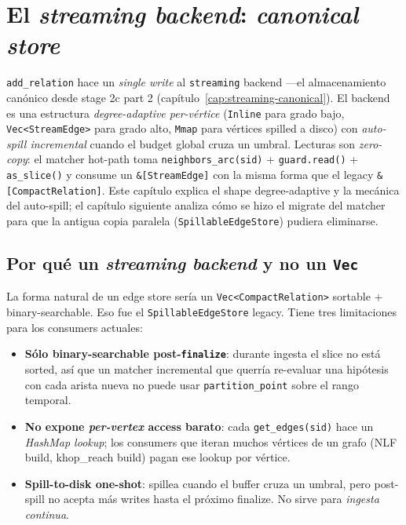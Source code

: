 \chapter{El \emph{streaming backend}: \emph{canonical store}}
\label{cap:streaming-mirror}

\begin{intuicion}
\texttt{add\_relation} hace un \emph{single write} al
\texttt{streaming} backend ---el almacenamiento canónico desde
stage 2c part 2 (capítulo~\ref{cap:streaming-canonical}). El
backend es una estructura \emph{degree-adaptive per-vértice}
(\texttt{Inline} para grado bajo, \texttt{Vec<StreamEdge>} para
grado alto, \texttt{Mmap} para vértices spilled a disco) con
\emph{auto-spill incremental} cuando el budget global cruza un
umbral. Lecturas son \emph{zero-copy}: el matcher hot-path toma
\texttt{neighbors\_arc(sid)} + \texttt{guard.read()} +
\texttt{as\_slice()} y consume un \texttt{\&[StreamEdge]} con la
misma forma que el legacy \texttt{\&[CompactRelation]}. Este
capítulo explica el shape degree-adaptive y la mecánica del
auto-spill; el capítulo siguiente analiza cómo se hizo el migrate
del matcher para que la antigua copia paralela
(\texttt{SpillableEdgeStore}) pudiera eliminarse.
\end{intuicion}

\section{Por qué un \emph{streaming backend} y no un \texttt{Vec}}

La forma natural de un edge store sería un \texttt{Vec<CompactRelation>}
sortable + binary-searchable. Eso fue el \texttt{SpillableEdgeStore}
legacy. Tiene tres limitaciones para los consumers actuales:

\begin{itemize}
    \item \textbf{Sólo binary-searchable post-\texttt{finalize}}:
    durante ingesta el slice no está sorted, así que un matcher
    incremental que querría re-evaluar una hipótesis con cada
    arista nueva no puede usar \texttt{partition\_point} sobre el
    rango temporal.
    \item \textbf{No expone \emph{per-vertex} access barato}: cada
    \texttt{get\_edges(sid)} hace un \emph{HashMap lookup}; los
    consumers que iteran muchos vértices de un grafo (NLF build,
    khop\_reach build) pagan ese lookup por vértice.
    \item \textbf{Spill-to-disk one-shot}: spillea cuando el buffer
    cruza un umbral, pero post-spill no acepta más writes hasta el
    próximo finalize. No sirve para \emph{ingesta continua}.
\end{itemize}

